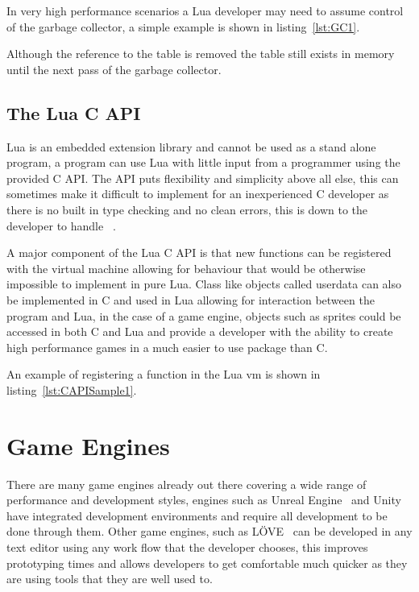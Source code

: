 \documentclass[11pt,a4paper,titlepage]{report}
\begin{document}
	In very high performance scenarios a Lua developer may need to assume control of the garbage collector, a simple example is shown in listing~\ref{lst:GC1}.

	\singlespacing
	
	\onehalfspacing

	
	Although the reference to the table is removed the table still exists in memory until the next pass of the garbage collector.

\subsection{The Lua C API}

	Lua is an embedded extension library and cannot be used as a stand alone program, a program can use Lua with little input from a programmer using the provided C API. The API puts flexibility and simplicity above all else, this can sometimes make it difficult to implement for an inexperienced C developer as there is no built in type checking and no clean errors, this is down to the developer to handle ~\cite{Ierusalimschy:2013:PLT:2502646}.

	A major component of the Lua C API is that new functions can be registered with the virtual machine allowing for behaviour that would be otherwise impossible to implement in pure Lua. Class like objects called userdata can also be implemented in C and used in Lua allowing for interaction between the program and Lua, in the case of a game engine, objects such as sprites could be accessed in both C and Lua and provide a developer with the ability to create high performance games in a much easier to use package than C.

	An example of registering a function in the Lua vm is shown in listing~\ref{lst:CAPISample1}.

	\singlespacing
	
	\onehalfspacing


\newpage

\section{Game Engines}
	
	There are many game engines already out there covering a wide range of performance and development styles, engines such as Unreal Engine~\cite{UE} and Unity~\cite{Unity} have integrated development environments and require all development to be done through them. Other game engines, such as LÖVE~\cite{LOVE} can be developed in any text editor using any work flow that the developer chooses, this improves prototyping times and allows developers to get comfortable much quicker as they are using tools that they are well used to.
\end{document}
